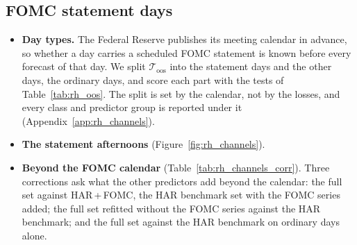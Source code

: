 \subsection{FOMC statement days}
\label{sec:rh_results_channels}
\begin{itemize}
\item \textbf{Day types.} The Federal Reserve publishes its meeting calendar in advance, so whether a day carries a
  scheduled FOMC statement is known before every forecast of that day. We split $\mathcal T_{\mathrm{oos}}$ into the
  \rhchNEventDays{} statement days and the \rhchNOrdDays{} other days, the ordinary days, and score each part with the
  tests of Table~\ref{tab:rh_oos}. The split is set by the calendar, not by the losses, and every class and predictor
  group is reported under it (Appendix~\ref{app:rh_channels}).
\item \textbf{The statement afternoons} (Figure~\ref{fig:rh_channels}).
\item \textbf{Beyond the FOMC calendar} (Table~\ref{tab:rh_channels_corr}). Three corrections ask what the other
  predictors add beyond the calendar: the full set against HAR\,+\,FOMC, the HAR benchmark set with the FOMC series
  added; the full set refitted without the FOMC series against the HAR benchmark; and the full set against the HAR
  benchmark on ordinary days alone.
\end{itemize}











